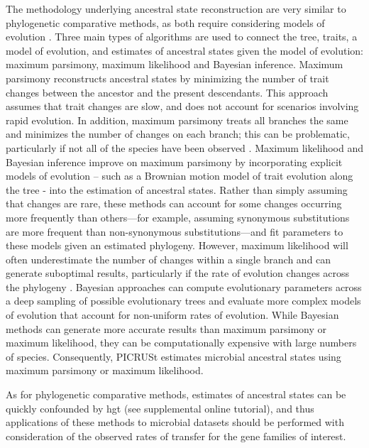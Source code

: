 The methodology underlying ancestral state reconstruction are very similar to phylogenetic comparative methods, as both require considering models of evolution \cite{ancestral_character_states}. Three main types of algorithms are used to connect the tree, traits, a model of evolution, and estimates of ancestral states given the model of evolution: maximum parsimony, maximum likelihood and Bayesian inference\cite{ancestral_character_states}. Maximum parsimony reconstructs ancestral states by minimizing the number of trait changes between the ancestor and the present descendants. This approach assumes that trait changes are slow, and does not account for scenarios involving rapid evolution. In addition, maximum parsimony treats all branches the same and minimizes the number of changes on each branch; this can be problematic, particularly if not all of the species have been observed \cite{ancestral_reconstruction}. Maximum likelihood and Bayesian inference improve on maximum parsimony by incorporating explicit models of evolution – such as a Brownian motion model of trait evolution along the tree - into the estimation of ancestral states. Rather than simply assuming that changes are rare, these methods can account for some changes occurring more frequently than others—for example, assuming synonymous substitutions are more frequent than non-synonymous substitutions—and fit parameters to these models given an estimated phylogeny.  However, maximum likelihood will often underestimate the number of changes within a single branch and can generate suboptimal results, particularly if the rate of evolution changes across the phylogeny \cite{simulation_comparison}. Bayesian approaches can compute evolutionary parameters across a deep sampling of possible evolutionary trees and evaluate more complex models of evolution that account for non-uniform rates of evolution. While Bayesian methods can generate more accurate results than maximum parsimony or maximum likelihood, they can be computationally expensive with large numbers of species.  Consequently, PICRUSt estimates microbial ancestral states using maximum parsimony or maximum likelihood. \par
As for phylogenetic comparative methods, estimates of ancestral states can be quickly confounded by \gls{hgt} (see supplemental online tutorial), and thus applications of these methods to microbial datasets should be performed with consideration of the observed rates of transfer for the gene families of interest.
